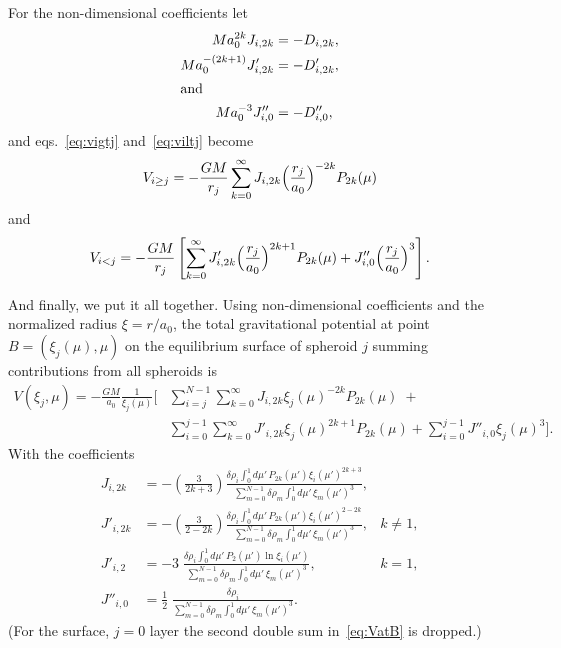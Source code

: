 \documentclass[amsmath,amsfonts,rmp,letterpaper]{revtex4}
\renewcommand{\inf}{\infty}
\newcommand{\ptk}{P_{2k}}
\newcommand{\sumonk}{\sum_{k=0}^{\inf}}
\newcommand{\dro}{\delta\rho}
\newcommand{\mupint}{\int_{0}^{1}d\mu'\,}
\begin{document}
For the non-dimensional coefficients let
\begin{subequations}
\begin{align}
Ma_0^{2k}J_{i,2k} &= -D_{i,2k},\\
Ma_0^{-(2k+1)}J'_{i,2k} &= -D'_{i,2k},\\
\intertext{and}
Ma_0^{-3}J''_{i,0} &= -D''_{i,0},
\end{align}
\end{subequations}
and eqs.~\eqref{eq:vigtj} and~\eqref{eq:viltj} become
\begin{equation}
V_{i\ge{j}} = -\frac{GM}{r_j}
\sumonk{}J_{i,2k}\Bigl(\frac{r_j}{a_0}\Bigr)^
{-2k}\ptk(\mu)
\end{equation}
and
\begin{equation}
V_{i<j} = -\frac{GM}{r_j}\left[
\sumonk{}J'_{i,2k}\Bigl(\frac{r_j}{a_0}\Bigr)^{2k+1}\ptk(\mu) +
J''_{i,0}\Bigl(\frac{r_j}{a_0}\Bigr)^3 \right].
\end{equation}

And finally, we put it all together. Using non-dimensional coefficients and the
normalized radius $\xi=r/a_0$, the total gravitational potential at point
$B=(\xi_j(\mu),\mu)$ on the equilibrium surface of spheroid $j$ summing
contributions from all spheroids is
\begin{equation}\label{eq:VatB}
\begin{split}
V(\xi_j,\mu) = 
-\frac{GM}{a_0}\frac{1}{\xi_j(\mu)}\Biggl[
&\sum_{i=j}^{N-1}\sumonk{}J_{i,2k}\xi_j(\mu)^{-2k}\ptk(\mu)\; + \\
& \sum_{i=0}^{j-1}\sumonk{}J'_{i,2k}\xi_j(\mu)^{2k+1}\ptk(\mu) + 
  \sum_{i=0}^{j-1} J''_{i,0}\xi_j(\mu)^3
\Biggr].
\end{split}
\end{equation}
With the coefficients
\begin{subequations}\label{eq:J_menagerie}
\begin{align}
J_{i,2k} &= -\left(\frac{3}{2k + 3}\right)
\frac{\dro_i\mupint\ptk(\mu')\xi_i(\mu')^{2k + 3}}
{\sum_{m=0}^{N-1}\dro_m\mupint\xi_m(\mu')^3},\\
J'_{i,2k} &= -\left(\frac{3}{2 - 2k}\right)
\frac{\dro_i\mupint\ptk(\mu')\xi_i(\mu')^{2 - 2k}}
{\sum_{m=0}^{N-1}\dro_m\mupint\xi_m(\mu')^3}, & k\ne{1},\\
J'_{i,2} &= -3\;
\frac{\dro_i\mupint{}P_2(\mu')\ln{\xi_i(\mu')}}
{\sum_{m=0}^{N-1}\dro_m\mupint\xi_m(\mu')^3}, & k=1,\\
J''_{i,0} &= \frac{1}{2}\;
\frac{\dro_i}{\sum_{m=0}^{N-1}\dro_m\mupint\xi_m(\mu')^3}.
\end{align}
\end{subequations}
(For the surface, $j=0$ layer the second double sum in~\eqref{eq:VatB} is
dropped.)
\end{document}
